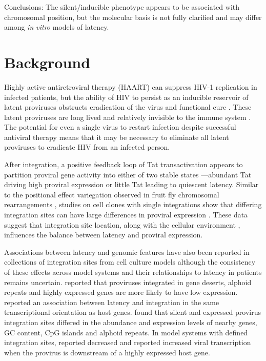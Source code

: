 \documentclass[../sherrill-Mix_thesis.tex]{subfiles}
\begin{document}
	Conclusions: The silent/inducible phenotype appears to be associated with chromosomal position, but the molecular basis is not fully clarified and may differ among \textit{in vitro} models of latency.

\section{Background}
	Highly active antiretroviral therapy (HAART) can suppress HIV-1 replication in infected patients, but the ability of HIV to persist as an inducible reservoir of latent proviruses \citep{Chun1995, Chun1997, Davey1999} obstructs eradication of the virus and functional cure \citep{Richman2009}. These latent proviruses are long lived \citep{Finzi1999,Siliciano2003} and relatively invisible to the immune system \citep{Finzi1997,Chun1997}. The potential for even a single virus to restart infection despite successful antiviral therapy means that it may be necessary to eliminate all latent proviruses to eradicate HIV from an infected person. %


	After integration, a positive feedback loop of Tat transactivation appears to partition proviral gene activity into either of two stable states \citep{Weinberger2008,Singh2010,Razooky2011}---abundant Tat driving high proviral expression or little Tat leading to quiescent latency. Similar to the positional effect variegation observed in fruit fly chromosomal rearrangements \citep{Muller1930,Gaszner2006}, studies on cell clones with single integrations show that differing integration sites can have large differences in proviral expression \citep{Jordan2001,Jordan2003,Pearson2008}. These data suggest that integration site location, along with the cellular environment \citep{Romerio1997,Coull2000,He2002,Pearson2008}, influences the balance between latency and proviral expression.  %


	 Associations between latency and genomic features have also been reported in collections of integration sites from cell culture models although the consistency of these effects across model systems and their relationships to latency in patients remains uncertain. \citet{Lewinski2005} reported that proviruses integrated in gene deserts, alphoid repeats and highly expressed genes are more likely to have low expression. \citet{Shan2011} reported an association between latency and integration in the same transcriptional orientation as host genes. \citet{Pace2012} found that silent and expressed provirus integration sites differed in the abundance and expression levels of nearby genes, GC content, CpG islands and alphoid repeats.  In model systems with defined integration sites, \citet{Lenasi2008} reported decreased and \citet{Han2008} reported increased viral transcription when the provirus is downstream of a highly expressed host gene. 
\end{document}
